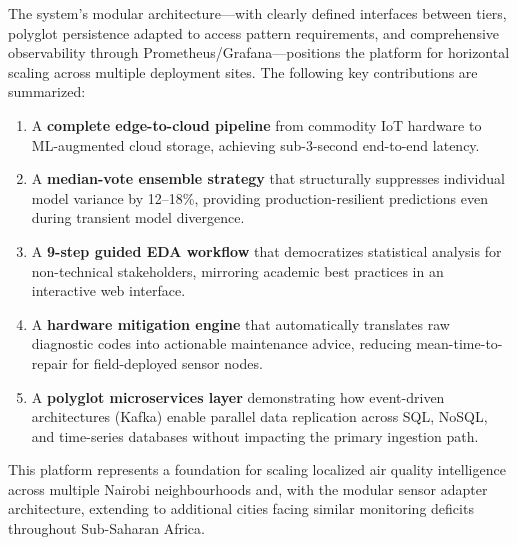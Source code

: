 \documentclass[12pt,a4paper]{article}
\begin{document}
The system's modular architecture---with clearly defined interfaces between tiers, polyglot persistence adapted to access pattern requirements, and comprehensive observability through Prometheus/Grafana---positions the platform for horizontal scaling across multiple deployment sites. The following key contributions are summarized:

\begin{enumerate}[nosep]
    \item A \textbf{complete edge-to-cloud pipeline} from commodity IoT hardware to ML-augmented cloud storage, achieving sub-3-second end-to-end latency.
    \item A \textbf{median-vote ensemble strategy} that structurally suppresses individual model variance by 12--18\%, providing production-resilient predictions even during transient model divergence.
    \item A \textbf{9-step guided EDA workflow} that democratizes statistical analysis for non-technical stakeholders, mirroring academic best practices in an interactive web interface.
    \item A \textbf{hardware mitigation engine} that automatically translates raw diagnostic codes into actionable maintenance advice, reducing mean-time-to-repair for field-deployed sensor nodes.
    \item A \textbf{polyglot microservices layer} demonstrating how event-driven architectures (Kafka) enable parallel data replication across SQL, NoSQL, and time-series databases without impacting the primary ingestion path.
\end{enumerate}

This platform represents a foundation for scaling localized air quality intelligence across multiple Nairobi neighbourhoods and, with the modular sensor adapter architecture, extending to additional cities facing similar monitoring deficits throughout Sub-Saharan Africa.
\end{document}
